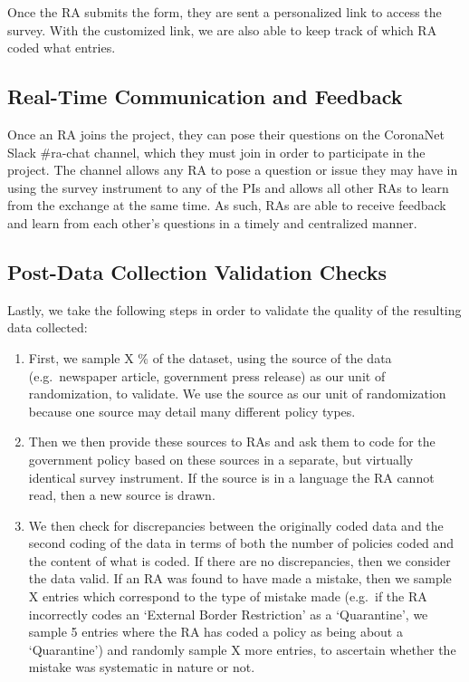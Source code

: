 \documentclass[
]{article}
\begin{document}
Once the RA submits the form, they are sent a personalized link to access the survey. With the customized link, we are also able to keep track of which RA coded what entries.

\hypertarget{real-time-communication-and-feedback}{%
\subsection{Real-Time Communication and Feedback}\label{real-time-communication-and-feedback}}

Once an RA joins the project, they can pose their questions on the CoronaNet Slack \#ra-chat channel, which they must join in order to participate in the project. The channel allows any RA to pose a question or issue they may have in using the survey instrument to any of the PIs and allows all other RAs to learn from the exchange at the same time. As such, RAs are able to receive feedback and learn from each other's questions in a timely and centralized manner.

\hypertarget{post-data-collection-validation-checks}{%
\subsection{Post-Data Collection Validation Checks}\label{post-data-collection-validation-checks}}

Lastly, we take the following steps in order to validate the quality of the resulting data collected:

\begin{enumerate}
\def\labelenumi{\arabic{enumi}.}
\item
  First, we sample X \% of the dataset, using the source of the data (e.g.~newspaper article, government press release) as our unit of randomization, to validate. We use the source as our unit of randomization because one source may detail many different policy types.
\item
  Then we then provide these sources to RAs and ask them to code for the government policy based on these sources in a separate, but virtually identical survey instrument. If the source is in a language the RA cannot read, then a new source is drawn.
\item
  We then check for discrepancies between the originally coded data and the second coding of the data in terms of both the number of policies coded and the content of what is coded. If there are no discrepancies, then we consider the data valid. If an RA was found to have made a mistake, then we sample X entries which correspond to the type of mistake made (e.g.~if the RA incorrectly codes an `External Border Restriction' as a `Quarantine', we sample 5 entries where the RA has coded a policy as being about a `Quarantine') and randomly sample X more entries, to ascertain whether the mistake was systematic in nature or not.
\end{enumerate}
\end{document}
